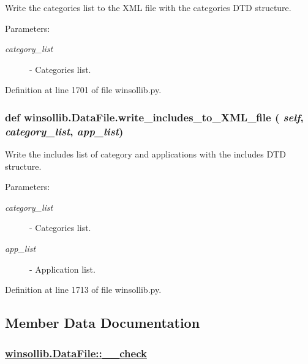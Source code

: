 Write the categories list to the XML file with the categories DTD structure. 

\begin{Desc}
\item[Parameters:]
\begin{description}
\item[{\em category\_\-list}]- Categories list. \end{description}
\end{Desc}


Definition at line 1701 of file winsollib.py.\hypertarget{classwinsollib_1_1DataFile_76c4b5fd1fac580996b094f31c6f5f7a}{
\subsubsection[write\_\-includes\_\-to\_\-XML\_\-file]{\setlength{\rightskip}{0pt plus 5cm}def winsollib.Data\-File.write\_\-includes\_\-to\_\-XML\_\-file ( {\em self},  {\em category\_\-list},  {\em app\_\-list})}}
\label{classwinsollib_1_1DataFile_76c4b5fd1fac580996b094f31c6f5f7a}


Write the includes list of category and applications with the includes DTD structure. 

\begin{Desc}
\item[Parameters:]
\begin{description}
\item[{\em category\_\-list}]- Categories list. \item[{\em app\_\-list}]- Application list. \end{description}
\end{Desc}


Definition at line 1713 of file winsollib.py.

\subsection{Member Data Documentation}
\hypertarget{classwinsollib_1_1DataFile_e88564661aa0facb476bd06a63550b64}{
\subsubsection[\_\-\_\-check]{\setlength{\rightskip}{0pt plus 5cm}\hyperlink{classwinsollib_1_1DataFile_e88564661aa0facb476bd06a63550b64}{winsollib.Data\-File::\_\-\_\-check}}}
\label{classwinsollib_1_1DataFile_e88564661aa0facb476bd06a63550b64}


